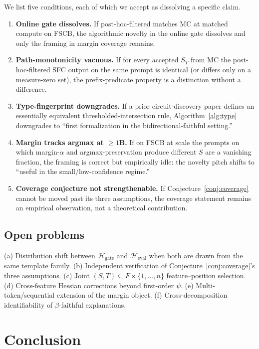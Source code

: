 \documentclass[10pt]{article}
\begin{document}
We list five conditions, each of which we accept as dissolving a specific claim.

\begin{enumerate}
  \item \textbf{Online gate dissolves.} If post-hoc-filtered \citet{marks2024sparse} matches MC at matched compute on FSCB, the algorithmic novelty in the online gate dissolves and only the framing in margin coverage remains.
  \item \textbf{Path-monotonicity vacuous.} If for every accepted $S_T$ from MC the post-hoc-filtered SFC output on the same prompt is identical (or differs only on a measure-zero set), the prefix-predicate property is a distinction without a difference.
  \item \textbf{Type-fingerprint downgrades.} If a prior circuit-discovery paper defines an essentially equivalent thresholded-intersection rule, Algorithm~\ref{alg:type} downgrades to ``first formalization in the bidirectional-faithful setting.''
  \item \textbf{Margin tracks argmax at $\geq 1$B.} If on FSCB at scale the prompts on which margin-$\alpha$ and argmax-preservation produce different $S$ are a vanishing fraction, the framing is correct but empirically idle: the novelty pitch shifts to ``useful in the small/low-confidence regime.''
  \item \textbf{Coverage conjecture not strengthenable.} If Conjecture~\ref{conj:coverage} cannot be moved past its three assumptions, the coverage statement remains an empirical observation, not a theoretical contribution.
\end{enumerate}

\subsection{Open problems}

(a) Distribution shift between $\mathcal{H}_{\text{gate}}$ and $\mathcal{H}_{\text{eval}}$ when both are drawn from the same template family. (b) Independent verification of Conjecture~\ref{conj:coverage}'s three assumptions. (c) Joint $(S, T) \subseteq F \times \{1,\dots,n\}$ feature--position selection. (d) Cross-feature Hessian corrections beyond first-order $\psi$. (e) Multi-token/sequential extension of the margin object. (f) Cross-decomposition identifiability of $\beta$-faithful explanations.

\section{Conclusion}
\label{sec:conclusion}
\end{document}
